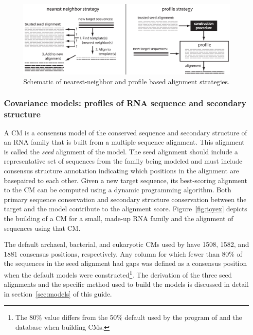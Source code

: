 \begin{figure}
  \begin{center}
\includegraphics[width=6in]{Figures/nnprof}
  \end{center}
  \caption{Schematic of nearest-neighbor and
        profile based alignment strategies.}
  \label{fig:nnprof}
\end{figure}

\subsubsection{Covariance models: profiles of RNA sequence and secondary structure}

A CM is a consensus model of the conserved sequence and secondary
structure of an RNA family that is built from a multiple sequence
alignment. This alignment is called the \emph{seed}
alignment of the model. The seed alignment should
include a representative set of sequences from the family being
modeled and must include consensus structure annotation indicating
which positions in the alignment are basepaired to each other.  Given
a new target sequence, its best-scoring alignment to the CM can be
computed using a dynamic programming algorithm. Both primary
sequence conservation and secondary structure conservation between the target
and the model contribute to the alignment score.
Figure~\ref{fig:toyex} depicts the building of a CM for a small,
made-up RNA family and the alignment of sequences using that CM.

The default archaeal, bacterial, and eukaryotic CMs used by
 have 1508, 1582, and 1881 consensus positions,
respectively. Any column for which fewer than 80\% of the sequences in
the seed alignment had gaps was defined as a consensus position when
the default models were constructed\footnote{The 80\% value differs
  from the 50\% default used by the  program of
   and the  database when building CMs.}.
The derivation of the three seed alignments and the specific method
used to build the models is discussed in detail in
section~\ref{sec:models} of this guide.

